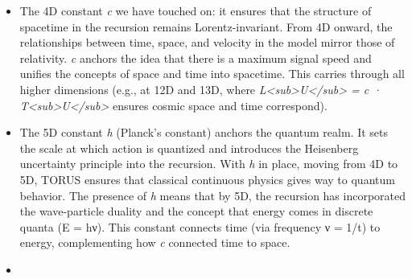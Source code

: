 \documentclass[
]{article}
\begin{document}
\begin{itemize}
  \textbf{consistency requirement}. Once 1D, 2D, 4D, and 5D constants
  (t\textless sub\textgreater P\textless/sub\textgreater,
  \ell\textless sub\textgreater P\textless/sub\textgreater, \emph{c},
  \emph{h}) are set, the value of \emph{G} (9D) must be such that this
  combination equals unity\hspace{0pt}, thereby \emph{determining}
  m\textless sub\textgreater P\textless/sub\textgreater. In effect,
  \emph{m\textless sub\textgreater P\textless/sub\textgreater{}} and
  \emph{G} are solved together to fit with the lower dimensions. The
  physical meaning is that at the 3D scale, a single particle's gravity
  is as strong as its quantum effects -- an anchor point where our usual
  separation of ``quantum vs gravity'' breaks down. TORUS takes the
  observed gravitational constant and shows it indeed yields a Planck
  mass of \textasciitilde2×10\^{}-8 kg, which matches this required
  balance. The fact that nature's actual \emph{G} produces the expected
  m\textless sub\textgreater P\textless/sub\textgreater{} is a strong
  consistency check for TORUS\hspace{0pt} -- it means the ``anchor'' was
  placed correctly.
\item
  The 4D constant \emph{c} we have touched on: it ensures that the
  structure of spacetime in the recursion remains Lorentz-invariant.
  From 4D onward, the relationships between time, space, and velocity in
  the model mirror those of relativity. \emph{c} anchors the idea that
  there is a maximum signal speed and unifies the concepts of space and
  time into spacetime. This carries through all higher dimensions (e.g.,
  at 12D and 13D, where
  \emph{L\textless sub\textgreater U\textless/sub\textgreater{} = c ·
  T\textless sub\textgreater U\textless/sub\textgreater{}} ensures
  cosmic space and time correspond\hspace{0pt}).
\item
  The 5D constant \emph{h} (Planck's constant) anchors the quantum
  realm. It sets the scale at which action is quantized and introduces
  the Heisenberg uncertainty principle into the recursion. With \emph{h}
  in place, moving from 4D to 5D, TORUS ensures that classical
  continuous physics gives way to quantum behavior. The presence of
  \emph{h} means that by 5D, the recursion has incorporated the
  wave-particle duality and the concept that energy comes in discrete
  quanta (E = hν). This constant connects time (via frequency ν = 1/t)
  to energy, complementing how \emph{c} connected time to space.
\item

\end{itemize}
\end{document}

